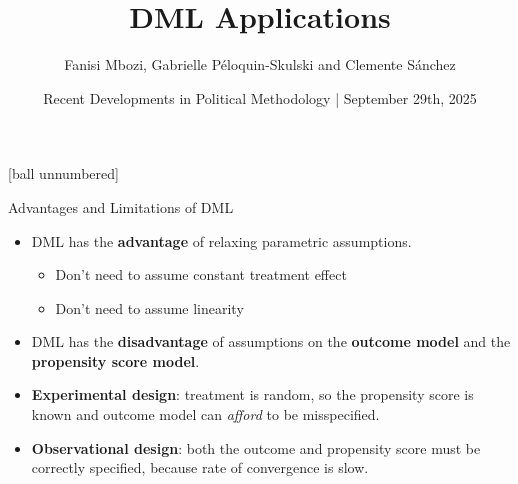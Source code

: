 \documentclass[10pt,table,aspectratio=169]{beamer}
\title{DML Applications}
\author{\vspace{-0.75em} Fanisi Mbozi, Gabrielle Péloquin-Skulski and Clemente Sánchez}
\date{\vspace{0.5em} Recent Developments in Political Methodology | September 29th, 2025}
\begin{document}
\maketitle


[ball unnumbered]



\begin{frame}[plain, label = two_dimensions]{Advantages and Limitations of DML}

\begin{itemize}
    \item DML has the \alert{\bf advantage} of relaxing parametric assumptions.  
    \begin{itemize}
        \item Don't need to assume constant treatment effect
        \item Don't need to assume linearity \pause
    \end{itemize}
        \vspace{0.5em}
    \item DML has the \alert{\bf disadvantage} of assumptions on the \alert{\bf outcome model} and the \alert{\bf propensity score model}. \pause
        \vspace{0.5em}
    \item \alert{\bf Experimental design}: treatment is random, so the propensity score is known and outcome model can \textit{afford} to be misspecified. \pause
        \vspace{0.5em}
    \item \alert{\bf Observational design}: both the outcome and propensity score must be correctly specified, because rate of convergence is slow.  
\end{itemize}
\end{frame}
\end{document}
